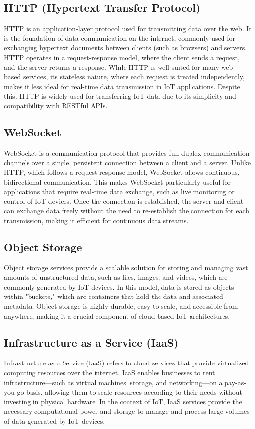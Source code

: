 \subsection*{HTTP (Hypertext Transfer Protocol)}
\label{sec:http}
HTTP is an application-layer protocol used for transmitting data over the web. It is the foundation of data communication on the internet, commonly used for exchanging hypertext documents between clients (such as browsers) and servers. HTTP operates in a request-response model, where the client sends a request, and the server returns a response. While HTTP is well-suited for many web-based services, its stateless nature, where each request is treated independently, makes it less ideal for real-time data transmission in IoT applications. Despite this, HTTP is widely used for transferring IoT data due to its simplicity and compatibility with RESTful APIs.

\subsection*{WebSocket}
\label{sec:websocket}
WebSocket is a communication protocol that provides full-duplex communication channels over a single, persistent connection between a client and a server. Unlike HTTP, which follows a request-response model, WebSocket allows continuous, bidirectional communication. This makes WebSocket particularly useful for applications that require real-time data exchange, such as live monitoring or control of IoT devices. Once the connection is established, the server and client can exchange data freely without the need to re-establish the connection for each transmission, making it efficient for continuous data streams.

\subsection*{Object Storage}
\label{sec:object-storage}
Object storage services provide a scalable solution for storing and managing vast amounts of unstructured data, such as files, images, and videos, which are commonly generated by IoT devices. In this model, data is stored as objects within "buckets," which are containers that hold the data and associated metadata. Object storage is highly durable, easy to scale, and accessible from anywhere, making it a crucial component of cloud-based IoT architectures.

\subsection*{Infrastructure as a Service (IaaS)}
\label{sec:iaas}
Infrastructure as a Service (IaaS) refers to cloud services that provide virtualized computing resources over the internet. IaaS enables businesses to rent infrastructure—such as virtual machines, storage, and networking—on a pay-as-you-go basis, allowing them to scale resources according to their needs without investing in physical hardware. In the context of IoT, IaaS services provide the necessary computational power and storage to manage and process large volumes of data generated by IoT devices.

